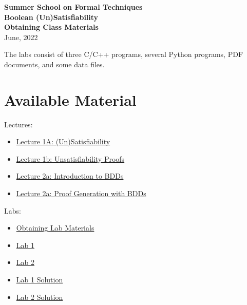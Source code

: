 \documentclass[12pt]{article}
\newcommand{\cref}[2]{\href{#1}{\color{blue}#2}}
\begin{document}
\begin{center}
{\LARGE\bf Summer School on Formal Techniques\\ [1.5 ex]
Boolean (Un)Satisfiability \\[2ex]
Obtaining Class Materials}\\ [2 ex]
June, 2022
\end{center}

The labs consist of three C/C++ programs, several Python programs, PDF
documents, and some data files.

\section*{Available Material}

Lectures:
\begin{itemize}
\item \cref{https://github.com/rebryant/unsat-tutorial/blob/main/instructor/slides/lecture-1a-intro.pdf}{Lecture 1A: (Un)Satisfiability}
\item \cref{https://github.com/rebryant/unsat-tutorial/blob/main/instructor/slides/lecture-1b-proof.pdf}{Lecture 1b: Unsatisfiability Proofs}
\item \cref{https://github.com/rebryant/unsat-tutorial/blob/main/instructor/slides/lecture-2a-bdd-intro.pdf}{Lecture 2a: Introduction to BDDs}
\item \cref{https://github.com/rebryant/unsat-tutorial/blob/main/instructor/slides/lecture-2b-bdd-proof.pdf}{Lecture 2a: Proof Generation with BDDs}
\end{itemize}  

Labs:
\begin{itemize}
\item \cref{https://github.com/rebryant/unsat-tutorial/blob/main/instructor/writeups/downloading.pdf}{Obtaining Lab Materials}
\item \cref{https://github.com/rebryant/unsat-tutorial/blob/main/instructor/writeups/lab1.pdf}{Lab 1}
\item \cref{https://github.com/rebryant/unsat-tutorial/blob/main/instructor/writeups/lab2.pdf}{Lab 2}
\item \cref{https://github.com/rebryant/unsat-tutorial/blob/main/instructor/writeups/lab1-solution.pdf}{Lab 1 Solution}
\item \cref{https://github.com/rebryant/unsat-tutorial/blob/main/instructor/writeups/lab2-solution.pdf}{Lab 2 Solution}
\end{itemize}
  
\end{document}
